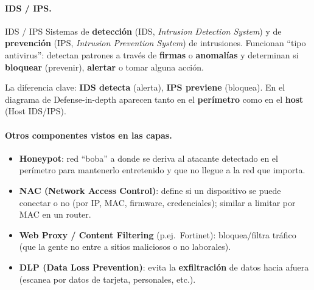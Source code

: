 \documentclass[../main.tex]{subfiles}
\begin{document}
\begin{center}
\end{center}

\paragraph{IDS / IPS.}
\begin{definicion}{IDS / IPS}
Sistemas de \textbf{detección} (IDS, \emph{Intrusion Detection System}) y de
\textbf{prevención} (IPS, \emph{Intrusion Prevention System}) de intrusiones.
Funcionan ``tipo antivirus'': detectan patrones a través de \textbf{firmas} o
\textbf{anomalías} y determinan si \textbf{bloquear} (prevenir), \textbf{alertar}
o tomar alguna acción.
\end{definicion}

\begin{examen}
La diferencia clave: \textbf{IDS detecta} (alerta), \textbf{IPS previene}
(bloquea). En el diagrama de Defense-in-depth aparecen tanto en el
\textbf{perímetro} como en el \textbf{host} (Host IDS/IPS).
\end{examen}

\paragraph{Otros componentes vistos en las capas.}
\begin{itemize}
  \item \textbf{Honeypot}: red ``boba'' a donde se deriva al atacante detectado
    en el perímetro para mantenerlo entretenido y que no llegue a la red que
    importa.
  \item \textbf{NAC (Network Access Control)}: define si un dispositivo se puede
    conectar o no (por IP, MAC, firmware, credenciales); similar a limitar por
    MAC en un router.
  \item \textbf{Web Proxy / Content Filtering} (p.ej.\ Fortinet): bloquea/filtra
    tráfico (que la gente no entre a sitios maliciosos o no laborales).
  \item \textbf{DLP (Data Loss Prevention)}: evita la \textbf{exfiltración} de
    datos hacia afuera (escanea por datos de tarjeta, personales, etc.).
\end{itemize}
\end{document}
